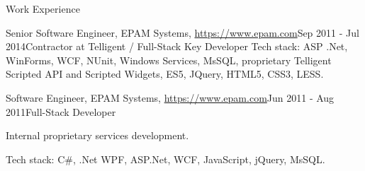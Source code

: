 \documentclass{resume}
\begin{document}
\begin{rSection}{Work Experience}
\begin{rSubsection}{Senior Software Engineer, EPAM Systems, \url{https://www.epam.com}}{Sep 2011 - Jul 2014}{Contractor at Telligent / Full-Stack Key Developer}{}
Tech stack:  ASP .Net, WinForms, WCF, NUnit, Windows Services, MsSQL, proprietary Telligent Scripted API and Scripted Widgets, ES5, JQuery, HTML5, CSS3, LESS.
\end{rSubsection}


\begin{rSubsection}{Software Engineer, EPAM Systems, \url{https://www.epam.com}}{Jun 2011 - Aug 2011}{Full-Stack Developer}{}
\item Internal proprietary services development.

Tech stack: C\#, .Net WPF, ASP.Net, WCF, JavaScript, jQuery, MsSQL.
\end{rSubsection}

\end{rSection}

\end{document}
